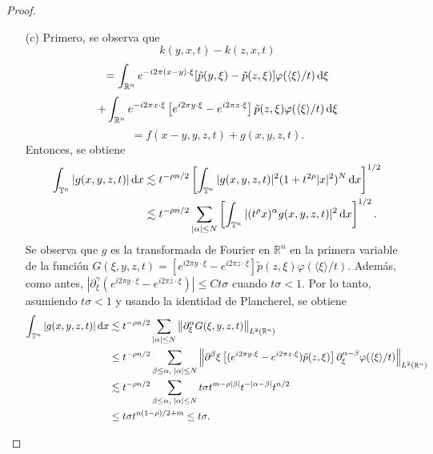 \begin{proof}
\begin{itemize}
		\item[(c)] Primero, se observa que
		\begin{equation*}
			k(y, x, t) - k(z, x, t) 
		\end{equation*}
		\begin{equation*}
			=\int_{\mathbb{R}^n} e^{-i2\pi (x-y) \cdot \xi}[\tilde{p}(y, \xi) - \tilde{p}(z, \xi)]\varphi(\langle\xi\rangle/t) \mathop{}\!\mathrm{d} \xi
		\end{equation*}
		\begin{equation*}
			+  
			\int_{\mathbb{R}^n} e^{-i2\pi x \cdot \xi} \left[ e^{i2\pi y \cdot \xi} -e^{i2\pi z \cdot \xi}  \right]\tilde{p}(z, \xi)\varphi(\langle\xi\rangle/t) \mathop{}\!\mathrm{d} \xi
		\end{equation*}
		\begin{equation*}
			=f(x-y, y, z, t) + g(x, y, z, t).
		\end{equation*}
		Entonces, se obtiene 
		\begin{align*}
			\int_{\mathbb{T}^n}|g(x, y, z, t)|\mathop{}\!\mathrm{d} x  & \lesssim t^{-\rho n/2} \left[ \int_{\mathbb{T}^n} |g(x, y, z, t)|^2(1 + t^{2\rho}|x|^2)^N \mathop{}\!\mathrm{d} x  \right]^{1/2}\\
			 & \lesssim t^{-\rho n/2} \sum_{|\alpha|\leq N}  \left[ \int_{\mathbb{T}^n} |(t^\rho x)^\alpha g(x, y, z, t)|^2\mathop{}\!\mathrm{d} x  \right]^{1/2}.
		\end{align*}
		Se observa que $g$ es la transformada de Fourier en $\mathbb{R}^n$ en la primera variable de la función $G(\xi, y, z, t) = \left[ e^{i2\pi y \cdot \xi} -e^{i2\pi z \cdot \xi}  \right]\tilde{p}(z, \xi)\varphi(\langle\xi\rangle/t)$. Además, como antes, $|\partial^\gamma_\xi( e^{i2\pi y \cdot \xi} -e^{i2\pi z \cdot \xi}  )| \leq Ct\sigma$ cuando $t\sigma<1$. Por lo tanto, asumiendo $t\sigma < 1$ y usando la identidad de Plancherel, se obtiene
		\begin{align*}
			\int_{\mathbb{T}^n}|g(x, y, z, t)|\diff x  &\lesssim t^{-\rho n/2} \sum_{|\alpha|\leq N} \left\| \partial^\alpha_\xi G(\xi, y, z ,t) \right\|_{L^2(\mathbb{R}^n)}\\ 
			 & \leq t^{-\rho n/2} \sum_{\beta\leq\alpha,\;|\alpha|\leq N} \left\| \partial^\beta\xi \left[ (e^{i2\pi y \cdot \xi} -e^{i2\pi z \cdot \xi})  \tilde{p}(z, \xi)\right]  \partial^{\alpha-\beta}_\xi\varphi(\langle\xi\rangle/t)  \right\|_{L^2(\mathbb{R}^n)} \\
			 & \lesssim t^{-\rho n/2} \sum_{\beta\leq\alpha,\;|\alpha|\leq N} t\sigma t^{m-\rho|\beta|}t^{-|\alpha-\beta|}t^{n/2} \\
			& \leq t\sigma t^{n(1-\rho)/2 + m} \leq t\sigma.

\end{align*}
\end{itemize}
\end{proof}

